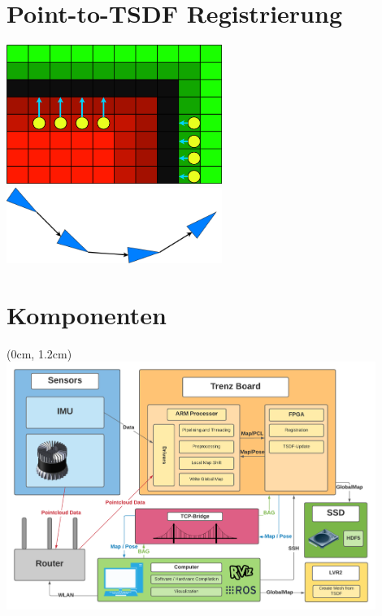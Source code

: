 \documentclass{beamer}
\begin{document}
\section{Point-to-TSDF Registrierung}
\begin{frame}{\secname}
\begin{center}
\includegraphics[width=7cm]{images/Reg_Gradient.png}
\includegraphics[width=7cm]{images/Pose_Graph.png}
\end{center}
\end{frame}

\section{Komponenten}
\begin{frame}{\secname}
\begin{textblock*}{12.8cm}(0cm, 1.2cm)
\centering
\includegraphics[width=12cm]{images/Architecture.pdf}
\end{textblock*}
\end{frame}
\end{document}

